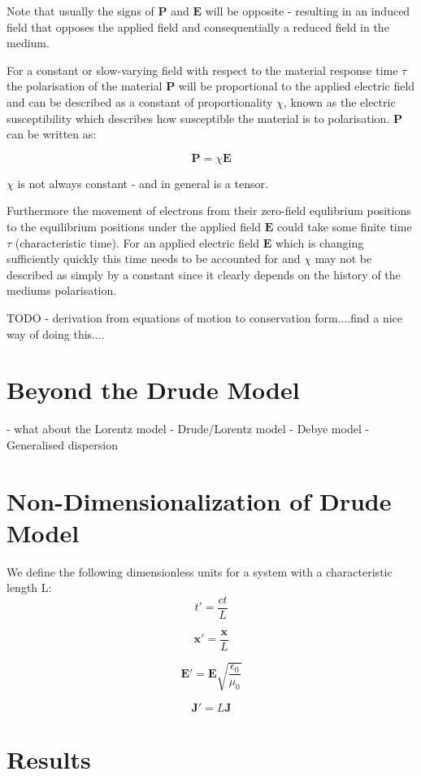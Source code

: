Note that usually the signs of $\mathbf{P}$ and $\mathbf{E}$ will be opposite - resulting in an induced field that opposes the applied field and consequentially a reduced field in the medium.


For a constant or slow-varying field with respect to the material response time $\tau$ the polarisation of the material $\mathbf{P}$ will be proportional to the applied electric field and can be described as a constant of proportionality $\chi$, known as the electric susceptibility which describes how susceptible the material is to polarisation. $\mathbf{P}$ can be written as:

$$
\mathbf{P} = \chi \mathbf{E}
$$

$\chi$ is not always constant - and in general is a tensor.

Furthermore the movement of electrons from their zero-field equlibrium positions to the equilibrium positions under the applied field $\mathbf{E}$ could take some finite time $\tau$ (characteristic time). For an applied electric field $\mathbf{E}$ which is changing sufficiently quickly this time needs to be accounted for and $\chi$ may not be described as simply by a constant since it clearly depends on the history of the mediums polarisation.

TODO - derivation from equations of motion to conservation form....find a nice way of doing this....

\section{Beyond the Drude Model}
- what about the Lorentz model
- Drude/Lorentz model
- Debye model
- Generalised dispersion

\section{Non-Dimensionalization of Drude Model}
We define the following dimensionless units for a system with a characteristic length L:
$$
t' = \frac{ct}{L}
$$

$$
\mathbf{x'} = \frac{\mathbf{x}}{L}
$$

$$
\mathbf{E'} = \mathbf{E}\sqrt{\frac{\epsilon_0}{\mu_0}}
$$

$$
\mathbf{J'} = L\mathbf{J}
$$

\section{Results}


